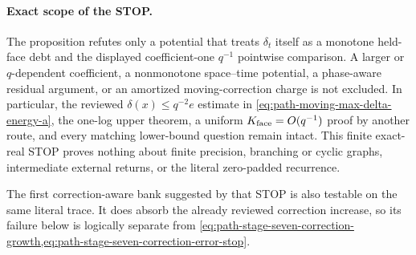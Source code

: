 \paragraph{Exact scope of the STOP.}
The proposition refutes only a potential that treats $\delta_t$ itself as a
monotone held-face debt and the displayed coefficient-one $q^{-1}$ pointwise
comparison.  A larger or $q$-dependent coefficient, a nonmonotone
space--time potential, a phase-aware residual argument, or an amortized
moving-correction charge is not excluded.  In particular, the reviewed
$\delta(x)\leq q^{-2}e$ estimate in
\cref{eq:path-moving-max-delta-energy-a}, the one-log upper theorem, a
uniform $K_{\rm face}=O(q^{-1})$ proof by another route, and every matching
lower-bound question remain intact.  This finite exact-real STOP proves
nothing about finite precision, branching or cyclic graphs, intermediate
external returns, or the literal zero-padded recurrence.

The first correction-aware bank suggested by that STOP is also testable on
the same literal trace.  It does absorb the already reviewed correction
increase, so its failure below is logically separate from
\cref{eq:path-stage-seven-correction-growth,eq:path-stage-seven-correction-error-stop}.


